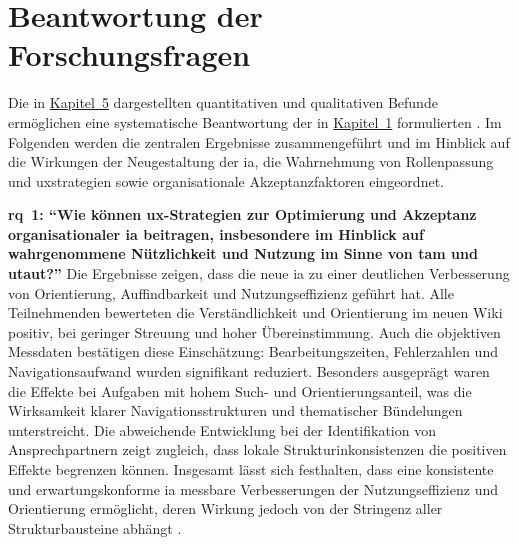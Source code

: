 \section{Beantwortung der Forschungsfragen}
\label{sec:06-02_research-questions-answers}

Die in \hyperref[ch:05_analysis-and-results]{Kapitel~5} dargestellten quantitativen und qualitativen Befunde ermöglichen eine systematische Beantwortung der in \hyperref[ch:01_purpose-and-objectives]{Kapitel~1} formulierten . Im Folgenden werden die zentralen Ergebnisse zusammengeführt und im Hinblick auf die Wirkungen der Neugestaltung der \Gls{ia}, die Wahrnehmung von Rollenpassung und \Gls{uxstrategien} sowie organisationale Akzeptanzfaktoren eingeordnet.

\newpage

\textbf{\Gls{rq}~1: \enquote{Wie können \Gls{ux}-Strategien zur Optimierung und Akzeptanz organisationaler \acrlong{ia} beitragen, insbesondere im Hinblick auf wahrgenommene Nützlichkeit und Nutzung im Sinne von \acrshort{tam} und \acrshort{utaut}?}}
Die Ergebnisse zeigen, dass die neue \Gls{ia} zu einer deutlichen Verbesserung von Orientierung, Auffindbarkeit und Nutzungseffizienz geführt hat. Alle Teilnehmenden bewerteten die Verständlichkeit und Orientierung im neuen Wiki positiv, bei geringer Streuung und hoher Übereinstimmung. Auch die objektiven Messdaten bestätigen diese Einschätzung: Bearbeitungszeiten, Fehlerzahlen und Navigationsaufwand wurden signifikant reduziert. Besonders ausgeprägt waren die Effekte bei Aufgaben mit hohem Such- und Orientierungsanteil, was die Wirksamkeit klarer Navigationsstrukturen und thematischer Bündelungen unterstreicht. Die abweichende Entwicklung bei der Identifikation von Ansprechpartnern zeigt zugleich, dass lokale Strukturinkonsistenzen die positiven Effekte begrenzen können. Insgesamt lässt sich festhalten, dass eine konsistente und erwartungskonforme \Gls{ia} messbare Verbesserungen der Nutzungseffizienz und Orientierung ermöglicht, deren Wirkung jedoch von der Stringenz aller Strukturbausteine abhängt \cite{303:Rosenfeld2015,113:NNGIntranetGuidelines}.

